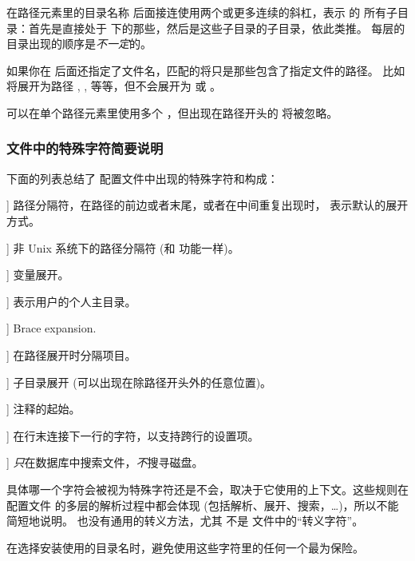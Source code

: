 \documentclass{article}
\begin{document}
在路径元素里的目录名称  后面接连使用两个或更多连续的斜杠，表示  的
所有子目录：首先是直接处于  下的那些，然后是这些子目录的子目录，依此类推。
每层的目录出现的顺序是\emph{不一定}的。

如果你在 \samp{//} 后面还指定了文件名，匹配的将只是那些包含了指定文件的路径。
比如  将展开为路径 , ,
 等等，但不会展开为  或 。

可以在单个路径元素里使用多个 \samp{//}，但出现在路径开头的 \samp{//}
将被忽略。

\subsubsection{ 文件中的特殊字符简要说明}
\label{sec:cnf-special-chars}

下面的列表总结了 \KPS{} 配置文件中出现的特殊字符和构成：

\newcommand{\CODE}[1]{\makebox[3em][l]{\code{#1}}}
\begin{ttdescription}
\item[\CODE{:}] 路径分隔符，在路径的前边或者末尾，或者在中间重复出现时，
表示默认的展开方式。\par
\item[\CODE{;}] 非 Unix 系统下的路径分隔符 (和 \code{:} 功能一样)。
\item[\CODE{\$}] 变量展开。
\item[\CODE{\string~}] 表示用户的个人主目录。
\item[\CODE{\char`\{...\char`\}}] Brace expansion.
\item[\CODE{,}] 在路径展开时分隔项目。
\item[\CODE{//}] 子目录展开 (可以出现在除路径开头外的任意位置)。
\item[\CODE{\%}] 注释的起始。
\item[\CODE{\bs}] 在行末连接下一行的字符，以支持跨行的设置项。
\item[\CODE{!!}] \emph{只}在数据库中搜索文件，\emph{不}搜寻磁盘。
\end{ttdescription}

具体哪一个字符会被视为特殊字符还是不会，取决于它使用的上下文。这些规则在配置文件
的多层的解析过程中都会体现 (包括解析、展开、搜索，\ldots)，所以不能简短地说明。
也没有通用的转义方法，尤其 \samp{\bs} 不是  文件中的“转义字符”。

在选择安装使用的目录名时，避免使用这些字符里的任何一个最为保险。
\end{document}

